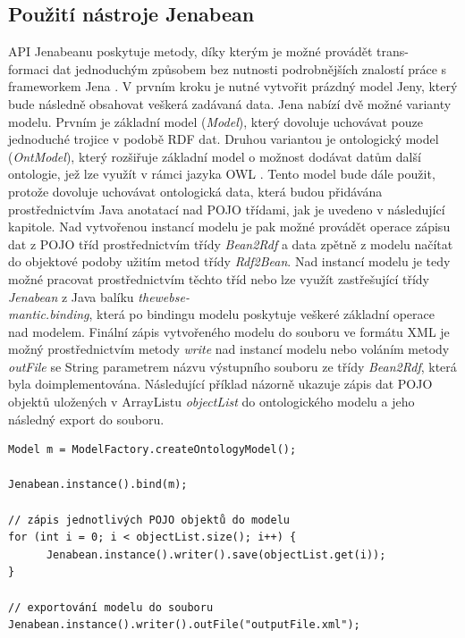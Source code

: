 \documentclass{projekt}
\begin{document}
\subsection{Použití nástroje Jenabean}
\hspace{0.65cm}API Jenabeanu poskytuje metody, díky kterým je možné provádět trans-\\formaci dat jednoduchým způsobem bez nutnosti podrobnějších znalostí práce s frameworkem Jena \cite{sedmnact}. 
V prvním kroku je nutné vytvořit prázdný model Jeny, který bude následně obsahovat veškerá zadávaná data. Jena nabízí dvě možné varianty modelu. Prvním je základní model ({\it Model}), který dovoluje uchovávat pouze jednoduché trojice v podobě RDF dat. Druhou variantou je ontologický model ({\it OntModel}), který rozšiřuje základní model o možnost dodávat datům další ontologie, jež lze využít v rámci jazyka OWL \cite{devet}. Tento model bude dále použit, protože dovoluje uchovávat ontologická data, která budou přidávána prostřednictvím Java anotatací nad POJO třídami, jak je uvedeno v následující kapitole.
Nad vytvořenou instancí modelu je pak možné provádět operace zápisu dat z POJO tříd prostřednictvím třídy {\it Bean2Rdf} a data zpětně z modelu načítat do objektové podoby užitím metod třídy {\it Rdf2Bean}. Nad instancí modelu je tedy možné pracovat prostřednictvím těchto tříd nebo lze využít zastřešující třídy {\it Jenabean} z Java balíku {\it thewebse-\\mantic.binding}, která po bindingu modelu poskytuje veškeré základní operace nad modelem. Finální zápis vytvořeného modelu do souboru ve formátu XML je možný prostřednictvím metody {\it write} nad instancí modelu nebo voláním metody {\it outFile} se String parametrem názvu výstupního souboru ze třídy {\it Bean2Rdf}, která byla doimplementována.  Následující příklad názorně ukazuje zápis dat POJO  objektů uložených v ArrayListu {\it objectList} do ontologického modelu a jeho následný export do souboru.

\begin{verbatim}
Model m = ModelFactory.createOntologyModel();

Jenabean.instance().bind(m);

// zápis jednotlivých POJO objektů do modelu
for (int i = 0; i < objectList.size(); i++) {
      Jenabean.instance().writer().save(objectList.get(i));
}
        
// exportování modelu do souboru
Jenabean.instance().writer().outFile("outputFile.xml");

\end{verbatim}
\end{document}

